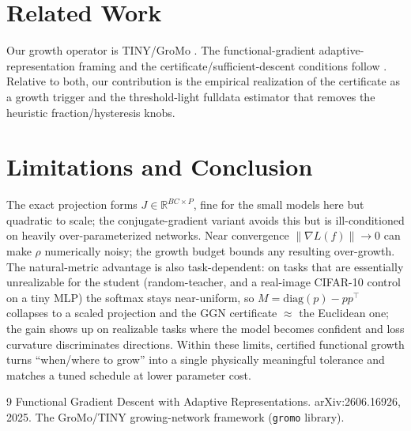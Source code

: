 \documentclass{article}
\newcommand{\R}{\mathbb{R}}
\newcommand{\norm}[1]{\left\lVert #1 \right\rVert}
\newcommand{\grad}{\nabla}
\begin{document}
\section{Related Work}
Our growth operator is TINY/GroMo \citep{tiny}. The functional-gradient
adaptive-representation framing and the certificate/sufficient-descent conditions
follow \citet{fgd2025}. Relative to both, our contribution is the empirical
realization of the certificate as a growth trigger and the threshold-light
fulldata estimator that removes the heuristic fraction/hysteresis knobs.

\section{Limitations and Conclusion}
The exact projection forms $J\in\R^{BC\times P}$, fine for the small models here
but quadratic to scale; the conjugate-gradient variant avoids this but is
ill-conditioned on heavily over-parameterized networks. Near convergence
$\norm{\grad L(f)}\!\to\!0$ can make $\rho$ numerically noisy; the growth budget
bounds any resulting over-growth. The natural-metric advantage is also
task-dependent: on tasks that are essentially unrealizable for the student
(random-teacher, and a real-image CIFAR-10 control on a tiny MLP) the softmax
stays near-uniform, so $M=\mathrm{diag}(p)-pp^\top$ collapses to a scaled
projection and the GGN certificate $\approx$ the Euclidean one; the gain shows up
on realizable tasks where the model becomes confident and loss curvature
discriminates directions. Within these limits, certified functional
growth turns ``when/where to grow'' into a single physically meaningful
tolerance and matches a tuned schedule at lower parameter cost.

\begin{thebibliography}{9}
Functional Gradient Descent with Adaptive Representations. arXiv:2606.16926, 2025.
The GroMo/TINY growing-network framework (\texttt{gromo} library).
\end{thebibliography}
\end{document}
